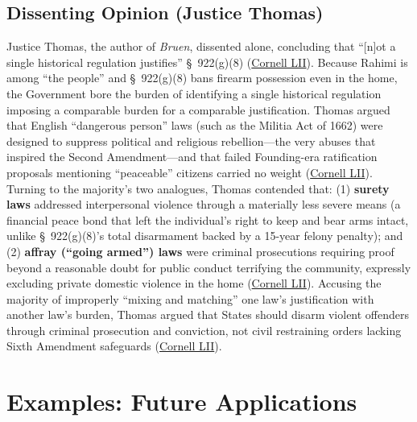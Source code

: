 \documentclass[12pt]{article}
\begin{document}
\subsection{Dissenting Opinion (Justice Thomas)}

Justice Thomas, the author of \textit{Bruen}, dissented alone, concluding that ``[n]ot a single historical regulation justifies'' \S\ 922(g)(8) (\href{https://www.law.cornell.edu/supremecourt/text/22-915}{Cornell LII}). Because Rahimi is among ``the people'' and \S\ 922(g)(8) bans firearm possession even in the home, the Government bore the burden of identifying a single historical regulation imposing a comparable burden for a comparable justification. Thomas argued that English ``dangerous person'' laws (such as the Militia Act of 1662) were designed to suppress political and religious rebellion---the very abuses that inspired the Second Amendment---and that failed Founding-era ratification proposals mentioning ``peaceable'' citizens carried no weight (\href{https://www.law.cornell.edu/supremecourt/text/22-915}{Cornell LII}). Turning to the majority's two analogues, Thomas contended that: (1) \textbf{surety laws} addressed interpersonal violence through a materially less severe means (a financial peace bond that left the individual's right to keep and bear arms intact, unlike \S\ 922(g)(8)'s total disarmament backed by a 15-year felony penalty); and (2) \textbf{affray (``going armed'') laws} were criminal prosecutions requiring proof beyond a reasonable doubt for public conduct terrifying the community, expressly excluding private domestic violence in the home (\href{https://www.law.cornell.edu/supremecourt/text/22-915}{Cornell LII}). Accusing the majority of improperly ``mixing and matching'' one law's justification with another law's burden, Thomas argued that States should disarm violent offenders through criminal prosecution and conviction, not civil restraining orders lacking Sixth Amendment safeguards (\href{https://www.law.cornell.edu/supremecourt/text/22-915}{Cornell LII}).

\section{Examples: Future Applications}
\end{document}
